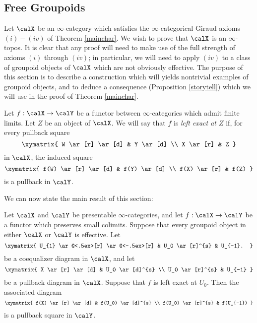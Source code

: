 \subsection{Free Groupoids}\label{freegroup}

Let $\calX$ be an $\infty$-category which satisfies the $\infty$-categorical Giraud axioms
$(i)-(iv)$ of Theorem \ref{mainchar}. We wish to prove that $\calX$ is an $\infty$-topos. It is clear that any proof will need to make use of the full strength of axioms $(i)$ through $(iv)$; in particular, we will need to apply $(iv)$ to a class of groupoid objects of $\calX$ which are not obviously effective.
The purpose of this section is to describe a construction which will yields nontrivial examples of groupoid objects, and to deduce a consequence (Proposition \ref{storytell})
which we will use in the proof of Theorem \ref{mainchar}.

\begin{definition}\label{swarpy}
Let $f: \calX \rightarrow \calY$ be a functor between $\infty$-categories which admit finite limits. Let
$Z$ be an object of $\calX$. We will say that $f$ is {\it left exact at $Z$} if, for every pullback square
$$ \xymatrix{ W \ar[r] \ar[d] & Y \ar[d] \\
X \ar[r] & Z }$$
in $\calX$, the induced square
$$ \xymatrix{ f(W) \ar[r] \ar[d] & f(Y) \ar[d] \\
f(X) \ar[r] & f(Z) }$$
is a pullback in $\calY$.
\end{definition}

We can now state the main result of this section:

\begin{proposition}\label{storytell}
Let $\calX$ and $\calY$ be presentable $\infty$-categories, and let $f: \calX \rightarrow \calY$ be a functor which preserves small colimits. Suppose that every groupoid object in either $\calX$ or $\calY$ is effective.
Let
$$ \xymatrix{ U_{1} \ar@<.5ex>[r] \ar@<-.5ex>[r] & U_0 \ar[r]^{s} & U_{-1}. } $$ be a coequalizer diagram in $\calX$, and let
$$ \xymatrix{ X \ar[r] \ar[d] & U_0 \ar[d]^{s} \\
U_0 \ar[r]^{s} & U_{-1} }$$ be a pullback diagram in $\calX$. Suppose that $f$ is left exact
at $U_0$. Then the associated diagram 
$$ \xymatrix{ f(X) \ar[r] \ar[d] & f(U_0) \ar[d]^{s} \\
f(U_0) \ar[r]^{s} & f(U_{-1}) }$$
is a pullback square in $\calY$.
\end{proposition}

